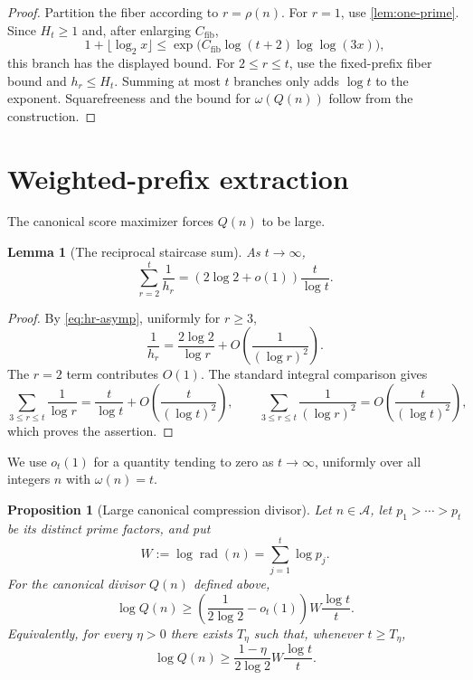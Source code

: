 \documentclass[11pt]{amsart}
\newtheorem{lemma}[lemma]{Lemma}
\newtheorem{proposition}[proposition]{Proposition}
\theoremstyle{definition}
\theoremstyle{remark}
\numberwithin{equation}{section}
\newcommand{\rad}{\operatorname{rad}}
\newcommand{\Acal}{\mathcal A}
\begin{document}
\begin{proof}
Partition the fiber according to $r=\rho(n)$.  For $r=1$, use
\cref{lem:one-prime}.  Since $H_t\ge1$ and, after enlarging
$C_{\mathrm{fib}}$,
\[
 1+\lfloor\log_2x\rfloor
 \le\exp\!\bigl(C_{\mathrm{fib}}\log(t+2)\log\log(3x)\bigr),
\]
this branch has the displayed bound.  For $2\le r\le t$, use the
fixed-prefix fiber bound and $h_r\le H_t$.  Summing at most $t$ branches
only adds $\log t$ to the exponent.  Squarefreeness and the bound for
$\omega(Q(n))$ follow from the construction.
\end{proof}

\section{Weighted-prefix extraction}

The canonical score maximizer forces $Q(n)$ to be large.

\begin{lemma}[The reciprocal staircase sum]\label{lem:hr-sum}
As $t\to\infty$,
\[
 \sum_{r=2}^t\frac1{h_r}
 =\left(2\log 2+o(1)\right)\frac t{\log t}.
\]
\end{lemma}

\begin{proof}
By \eqref{eq:hr-asymp}, uniformly for $r\ge3$,
\[
 \frac1{h_r}=\frac{2\log 2}{\log r}+O\!\left(\frac1{(\log r)^2}\right).
\]
The $r=2$ term contributes $O(1)$.  The standard integral comparison
gives
\[
 \sum_{3\le r\le t}\frac1{\log r}
 =\frac t{\log t}+O\!\left(\frac t{(\log t)^2}\right),
 \qquad
 \sum_{3\le r\le t}\frac1{(\log r)^2}
 =O\!\left(\frac t{(\log t)^2}\right),
\]
which proves the assertion.
\end{proof}

We use $o_t(1)$ for a quantity tending to zero as $t\to\infty$, uniformly
over all integers $n$ with $\omega(n)=t$.

\begin{proposition}[Large canonical compression divisor]\label{prop:weighted-prefix}
Let $n\in\Acal$, let $p_1>\cdots>p_t$ be its distinct prime factors, and put
\[
 W:=\log\rad(n)=\sum_{j=1}^t\log p_j.
\]
For the canonical divisor $Q(n)$ defined above,
\begin{equation}\label{eq:weighted-Q}
 \log Q(n)\ge
 \left(\frac1{2\log 2}-o_t(1)\right)
 W\frac{\log t}{t}.
\end{equation}
Equivalently, for every $\eta>0$ there exists $T_\eta$ such that, whenever $t\ge T_\eta$,
\begin{equation}\label{eq:weighted-Q-explicit}
 \log Q(n)\ge
 \frac{1-\eta}{2\log 2}
 W\frac{\log t}{t}.
\end{equation}
\end{proposition}
\end{document}
